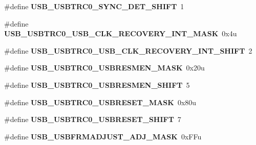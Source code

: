 \begin{DoxyCompactItemize}
\item 
\#define {\bfseries U\+S\+B\+\_\+\+U\+S\+B\+T\+R\+C0\+\_\+\+S\+Y\+N\+C\+\_\+\+D\+E\+T\+\_\+\+S\+H\+I\+FT}~1\hypertarget{group__USB__Register__Masks_ga986ea3386acad15ab845a8c5d9644c9e}{}\label{group__USB__Register__Masks_ga986ea3386acad15ab845a8c5d9644c9e}

\item 
\#define {\bfseries U\+S\+B\+\_\+\+U\+S\+B\+T\+R\+C0\+\_\+\+U\+S\+B\+\_\+\+C\+L\+K\+\_\+\+R\+E\+C\+O\+V\+E\+R\+Y\+\_\+\+I\+N\+T\+\_\+\+M\+A\+SK}~0x4u\hypertarget{group__USB__Register__Masks_ga588ecdb5189b26730014b09713a834db}{}\label{group__USB__Register__Masks_ga588ecdb5189b26730014b09713a834db}

\item 
\#define {\bfseries U\+S\+B\+\_\+\+U\+S\+B\+T\+R\+C0\+\_\+\+U\+S\+B\+\_\+\+C\+L\+K\+\_\+\+R\+E\+C\+O\+V\+E\+R\+Y\+\_\+\+I\+N\+T\+\_\+\+S\+H\+I\+FT}~2\hypertarget{group__USB__Register__Masks_ga10874c5a9f0c051773c2ed43af3375fe}{}\label{group__USB__Register__Masks_ga10874c5a9f0c051773c2ed43af3375fe}

\item 
\#define {\bfseries U\+S\+B\+\_\+\+U\+S\+B\+T\+R\+C0\+\_\+\+U\+S\+B\+R\+E\+S\+M\+E\+N\+\_\+\+M\+A\+SK}~0x20u\hypertarget{group__USB__Register__Masks_gaf236b1fdfa7f7dab54961c74538dfb75}{}\label{group__USB__Register__Masks_gaf236b1fdfa7f7dab54961c74538dfb75}

\item 
\#define {\bfseries U\+S\+B\+\_\+\+U\+S\+B\+T\+R\+C0\+\_\+\+U\+S\+B\+R\+E\+S\+M\+E\+N\+\_\+\+S\+H\+I\+FT}~5\hypertarget{group__USB__Register__Masks_ga4b62f293769f60cae99319d6bb1299e8}{}\label{group__USB__Register__Masks_ga4b62f293769f60cae99319d6bb1299e8}

\item 
\#define {\bfseries U\+S\+B\+\_\+\+U\+S\+B\+T\+R\+C0\+\_\+\+U\+S\+B\+R\+E\+S\+E\+T\+\_\+\+M\+A\+SK}~0x80u\hypertarget{group__USB__Register__Masks_ga3b307f8358be6942775121b6a92243ab}{}\label{group__USB__Register__Masks_ga3b307f8358be6942775121b6a92243ab}

\item 
\#define {\bfseries U\+S\+B\+\_\+\+U\+S\+B\+T\+R\+C0\+\_\+\+U\+S\+B\+R\+E\+S\+E\+T\+\_\+\+S\+H\+I\+FT}~7\hypertarget{group__USB__Register__Masks_gab20fcb9276a34cbbd33ac0364c419f13}{}\label{group__USB__Register__Masks_gab20fcb9276a34cbbd33ac0364c419f13}

\item 
\#define {\bfseries U\+S\+B\+\_\+\+U\+S\+B\+F\+R\+M\+A\+D\+J\+U\+S\+T\+\_\+\+A\+D\+J\+\_\+\+M\+A\+SK}~0x\+F\+Fu\hypertarget{group__USB__Register__Masks_ga3bbdc3dbdf46947a16a7b4429ad9a0c7}{}\label{group__USB__Register__Masks_ga3bbdc3dbdf46947a16a7b4429ad9a0c7}


\end{DoxyCompactItemize}
